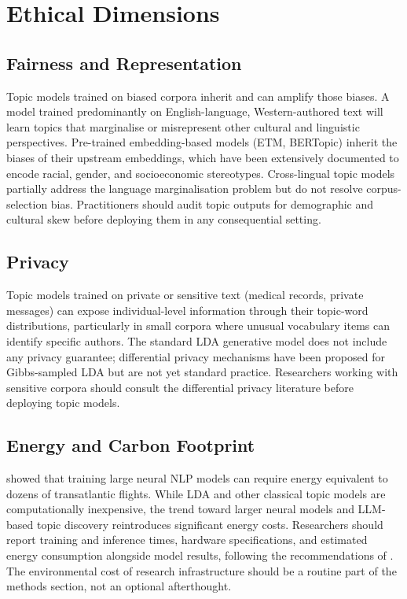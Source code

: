 \documentclass[11pt,a4paper]{article}
\begin{document}
\section{Ethical Dimensions}
\label{sec:ethics}

\subsection{Fairness and Representation}
\label{sec:fairness}

Topic models trained on biased corpora inherit and can amplify those
biases.
A model trained predominantly on English-language, Western-authored
text will learn topics that marginalise or misrepresent other cultural
and linguistic perspectives.
Pre-trained embedding-based models (ETM, BERTopic) inherit the biases
of their upstream embeddings, which have been extensively documented
to encode racial, gender, and socioeconomic stereotypes.
Cross-lingual topic models \parencite{bianchi2021crosslingual,
mimno2009polylingual} partially address the language marginalisation
problem but do not resolve corpus-selection bias.
Practitioners should audit topic outputs for demographic and cultural
skew before deploying them in any consequential setting.

\subsection{Privacy}
\label{sec:privacy}

Topic models trained on private or sensitive text (medical records,
private messages) can expose individual-level information through
their topic-word distributions, particularly in small corpora where
unusual vocabulary items can identify specific authors.
The standard LDA generative model does not include any privacy
guarantee; differential privacy mechanisms have been proposed for
Gibbs-sampled LDA but are not yet standard practice.
Researchers working with sensitive corpora should consult the
differential privacy literature before deploying topic models.

\subsection{Energy and Carbon Footprint}
\label{sec:energy}

\textcite{strubell2019energy} showed that training large neural NLP
models can require energy equivalent to dozens of transatlantic flights.
While LDA and other classical topic models are computationally
inexpensive, the trend toward larger neural models and LLM-based
topic discovery reintroduces significant energy costs.
Researchers should report training and inference times, hardware
specifications, and estimated energy consumption alongside model
results, following the recommendations of \citeauthor{strubell2019energy}.
The environmental cost of research infrastructure should be a routine
part of the methods section, not an optional afterthought.
\end{document}
